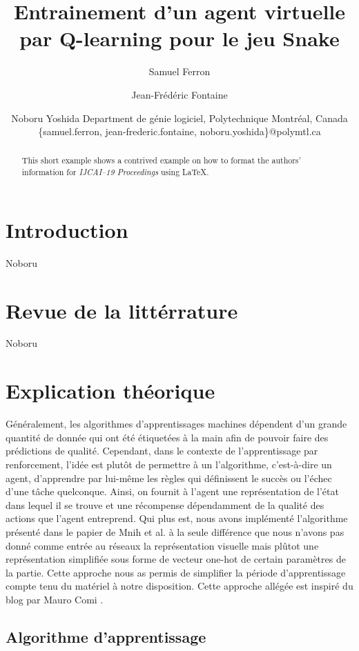 \documentclass{article}
\title{Entrainement d'un agent virtuelle par Q-learning pour le jeu Snake }
\author{
Samuel Ferron\and
Jean-Frédéric Fontaine\and
Noboru Yoshida
\affiliations
Department de génie logiciel, Polytechnique Montréal, Canada\\
\emails
\{samuel.ferron, jean-frederic.fontaine, noboru.yoshida\}@polymtl.ca
}
\begin{document}
\maketitle

\begin{abstract}
This short example shows a contrived example on how to format the authors' information for {\it IJCAI--19 Proceedings} using \LaTeX{}.
\end{abstract}

\section{Introduction}

Noboru

\section{Revue de la littérrature}
 
Noboru

\section{Explication théorique }
Généralement, les algorithmes d’apprentissages machines dépendent d’un grande quantité de donnée qui ont été étiquetées à la main afin de pouvoir faire des prédictions de qualité. Cependant, dans le contexte de l'apprentissage par renforcement, l’idée est plutôt de permettre à un l’algorithme, c’est-à-dire un agent, d’apprendre par lui-même les règles qui définissent le succès ou l’échec d’une tâche quelconque. Ainsi, on fournit à l’agent une représentation de l’état dans lequel il se trouve et une récompense dépendamment de la qualité des actions que l’agent entreprend. Qui plus est, nous avons implémenté l’algorithme présenté dans le papier de Mnih et al. \cite{DBLP:journals/corr/MnihKSGAWR13} à la seule différence que nous n'avons pas donné comme entrée au réseaux la représentation  visuelle mais plûtot une représentation simplifiée sous forme de vecteur one-hot de certain paramètres de la partie. Cette approche nous as permis de simplifier la période d'apprentissage compte tenu du matériel à notre disposition. Cette approche allégée est inspiré du blog par Mauro Comi \cite{comi_2020}. 


\subsection{Algorithme d'apprentissage}
\end{document}
